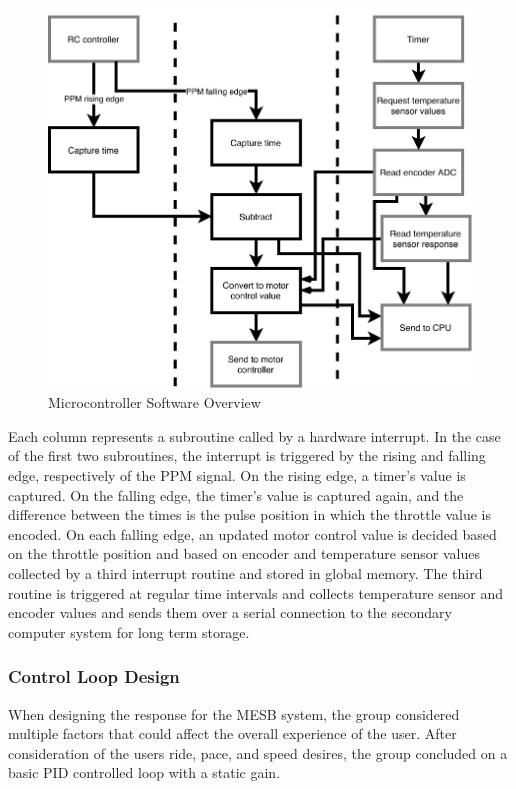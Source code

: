\documentclass[titlepage, letterpaper,12pt]{article}
\begin{document}
\begin{figure}[!htbp]\centering
\includegraphics{mcusoftware.pdf}
\caption{Microcontroller Software Overview}
\label{mcu-sw}
\end{figure}

Each column represents a subroutine called by a hardware interrupt. In the case of the first two subroutines, the interrupt is triggered by the rising and falling edge, respectively of the PPM signal. On  the rising edge, a timer's value is captured. On the falling edge, the timer's value is captured again, and the difference between the times is the pulse position in which the throttle value is encoded. On each falling edge, an updated motor control value is decided based on the throttle position and based on encoder and temperature sensor values collected by a third interrupt routine and stored in global memory. The third routine is triggered at regular time intervals and collects temperature sensor and encoder values and sends them over a serial connection to the secondary computer system for long term storage.

\subsubsection{Control Loop Design}
When designing the response for the MESB system, the group considered multiple factors that could affect the overall experience of the user. After consideration of the users ride, pace, and speed desires, the group concluded on a basic PID controlled loop with a static gain.
\end{document}
